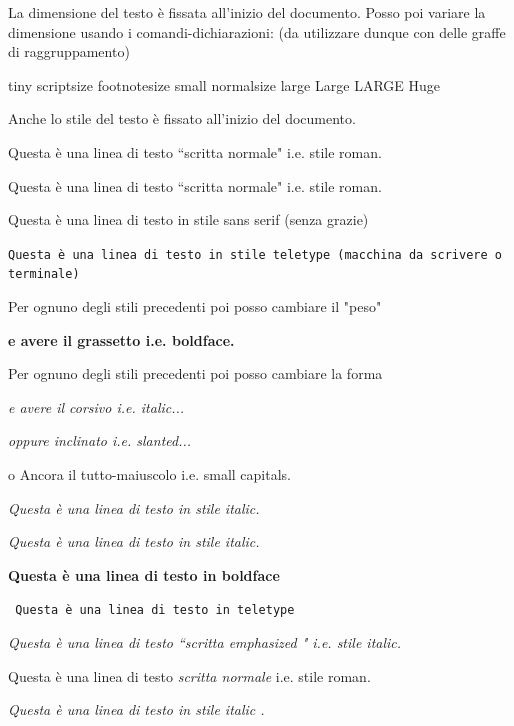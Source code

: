 \documentclass[12pt]{article}
\begin{document}
\newpage
La dimensione del testo \`e fissata all'inizio del documento. Posso poi variare la dimensione usando i comandi-dichiarazioni:
(da utilizzare dunque con delle graffe di raggruppamento)

{\tiny   tiny}
{\scriptsize  scriptsize}
{\footnotesize   footnotesize}
{\small   small }
{\normalsize  normalsize} 
{\large  large}
{\Large  Large}
{\LARGE LARGE}
{\Huge Huge}

\bigskip\bigskip\bigskip
Anche lo stile del testo \`e fissato all'inizio del documento.
\bigskip

Questa \`e una linea di testo ``scritta normale" i.e. stile roman.

{\rm Questa \`e una linea di testo ``scritta normale" i.e. stile roman.}

{\sf Questa \`e una linea di testo in stile sans serif (senza grazie)}

{\tt Questa \`e una linea di testo in stile teletype (macchina da scrivere o terminale)}


\medskip %
Per ognuno degli stili { precedenti} poi posso cambiare il "peso" 

{\bf  e avere il grassetto  i.e. boldface.}

\medskip %
Per ognuno degli stili precedenti poi posso cambiare la forma 

{\it e avere il corsivo i.e. italic... } 

{\sl oppure inclinato i.e. slanted...} 

{\sc o Ancora il tutto-maiuscolo i.e. small capitals}.

\medskip %


{\it Questa \`e una linea di testo in stile italic.}

\textit{ Questa \`e una linea di testo in stile italic.}

\textbf{ Questa \`e una linea di testo in boldface}

\texttt{ Questa \`e una linea di testo in teletype}



{\em Questa \`e una linea di testo ``scritta emphasized " i.e. stile italic.}

\bigskip

Questa \`e una linea di testo {\em scritta normale} i.e. stile roman. 
 
{\it Questa \`e una linea di testo {\em  in stile italic} .}

\bigskip
\end{document}
